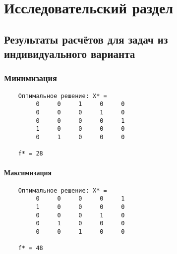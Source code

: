 

\chapter{Исследовательский раздел}

\section{Результаты расчётов для задач из индивидуального варианта}

\subsection{Минимизация}

\begin{verbatim}
	Оптимальное решение: X* =
	     0     0     1     0     0
	     0     0     0     1     0
	     0     0     0     0     1
	     1     0     0     0     0
	     0     1     0     0     0

	f* = 28
\end{verbatim}

\subsubsection{Максимизация}

\begin{verbatim}
	Оптимальное решение: X* =
	     0     0     0     0     1
	     1     0     0     0     0
	     0     0     0     1     0
	     0     1     0     0     0
	     0     0     1     0     0

	f* = 48
\end{verbatim}

